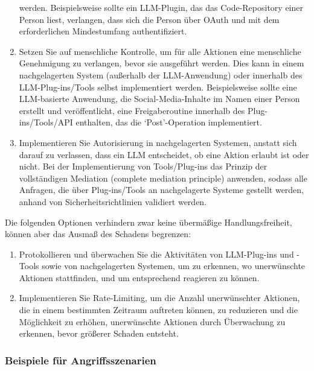 \documentclass[
]{article}
\providecommand{\tightlist}{%
  \setlength{\itemsep}{0pt}\setlength{\parskip}{0pt}}
\begin{document}
\begin{enumerate}
  werden. Beispielsweise sollte ein LLM-Plugin, das das Code-Repository
  einer Person liest, verlangen, dass sich die Person über OAuth und mit
  dem erforderlichen Mindestumfang authentifiziert.
\item
  Setzen Sie auf menschliche Kontrolle, um für alle Aktionen eine
  menschliche Genehmigung zu verlangen, bevor sie ausgeführt werden.
  Dies kann in einem nachgelagerten System (außerhalb der LLM-Anwendung)
  oder innerhalb des LLM-Plug-ins/Tools selbst implementiert werden.
  Beispielsweise sollte eine LLM-basierte Anwendung, die
  Social-Media-Inhalte im Namen einer Person erstellt und
  veröffentlicht, eine Freigaberoutine innerhalb des Plug-ins/Tools/API
  enthalten, das die `Post'-Operation implementiert.
\item
  Implementieren Sie Autorisierung in nachgelagerten Systemen, anstatt
  sich darauf zu verlassen, dass ein LLM entscheidet, ob eine Aktion
  erlaubt ist oder nicht. Bei der Implementierung von Tools/Plug-ins das
  Prinzip der vollständigen Mediation (complete mediation principle)
  anwenden, sodass alle Anfragen, die über Plug-ins/Tools an
  nachgelagerte Systeme gestellt werden, anhand von
  Sicherheitsrichtlinien validiert werden.
\end{enumerate}

Die folgenden Optionen verhindern zwar keine übermäßige
Handlungsfreiheit, können aber das Ausmaß des Schadens begrenzen:

\begin{enumerate}
\def\labelenumi{\arabic{enumi}.}
\tightlist
\item
  Protokollieren und überwachen Sie die Aktivitäten von LLM-Plug-ins und
  -Tools sowie von nachgelagerten Systemen, um zu erkennen, wo
  unerwünschte Aktionen stattfinden, und um entsprechend reagieren zu
  können.
\item
  Implementieren Sie Rate-Limiting, um die Anzahl unerwünschter
  Aktionen, die in einem bestimmten Zeitraum auftreten können, zu
  reduzieren und die Möglichkeit zu erhöhen, unerwünschte Aktionen durch
  Überwachung zu erkennen, bevor größerer Schaden entsteht.
\end{enumerate}

\subsubsection{Beispiele für
Angriffsszenarien}\label{beispiele-fuxfcr-angriffsszenarien}
\end{document}
